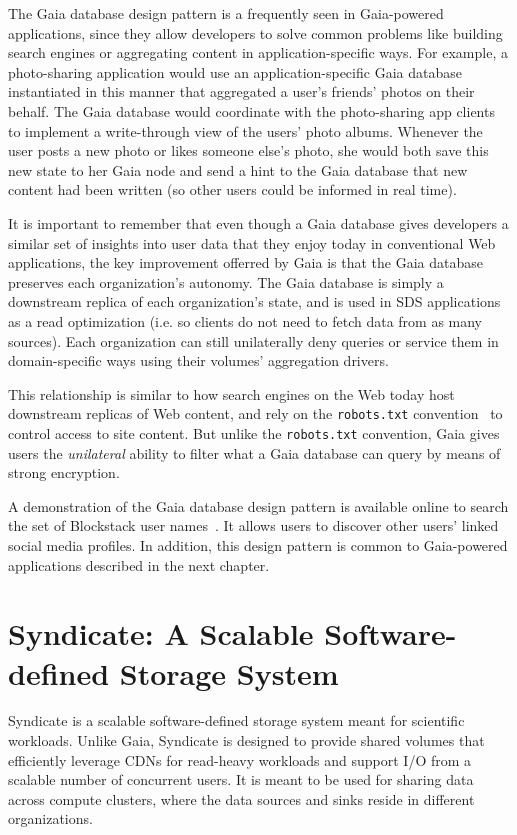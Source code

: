 The Gaia database design pattern is a frequently seen in Gaia-powered applications,
since they allow developers to solve common problems like building search
engines or aggregating content in application-specific ways.  For example, 
a photo-sharing application would use
an application-specific Gaia database instantiated in this manner that
aggregated a user's friends' photos on their behalf.  The Gaia database
would coordinate with the photo-sharing app clients to implement a write-through view of
the users' photo albums.  Whenever the user posts a new photo or likes someone else's
photo, she would both save this new state to her Gaia node and send a hint
to the Gaia database that new content had been written (so other users could
be informed in real time).

It is important to remember that even though a Gaia database gives
developers a similar set of insights into user data that they enjoy today in
conventional Web applications, the key improvement offerred by Gaia is that 
the Gaia database preserves each
organization's autonomy.  The Gaia database is simply a downstream replica of
each organization's state, and is used in SDS applications as a read optimization
(i.e. so clients do not need to fetch data from as many sources).
Each organization can still unilaterally deny queries or service them in
domain-specific ways using their volumes' aggregation drivers.

This relationship is similar to how search engines on the Web today host downstream
replicas of Web content, and rely on the \texttt{robots.txt}
convention~\cite{robots-txt-convention} to control access to site content.
But unlike the \texttt{robots.txt} convention, Gaia gives users the
\emph{unilateral} ability to filter what a Gaia database can query by means of
strong encryption.

A demonstration of the Gaia database design pattern is available online to search the
set of Blockstack user names~\cite{blockstack-explorer}.  It allows users to
discover other users' linked social media profiles.  In addition, this design
pattern is common to Gaia-powered applications described in the next chapter.

\section{Syndicate: A Scalable Software-defined Storage System}

Syndicate is a scalable software-defined storage system meant for scientific
workloads.  Unlike Gaia, Syndicate is designed to provide shared volumes that
efficiently leverage CDNs for read-heavy workloads and 
support I/O from a scalable number of concurrent users.  It is meant to be
used for sharing data across compute clusters, where the data sources and
sinks reside in different organizations.

